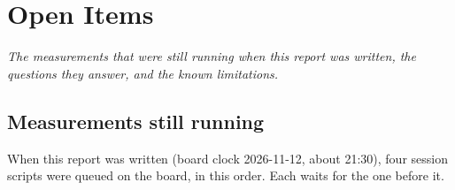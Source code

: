 \chapter{Open Items}\label{r03:ch:open}

\emph{The measurements that were still running when this report was written, the questions
they answer, and the known limitations.}

\section{Measurements still running}\label{r03:sec:open-jobs}

When this report was written (board clock 2026-11-12, about 21:30), four session scripts were
queued on the board, in this order. Each waits for the one before it.

